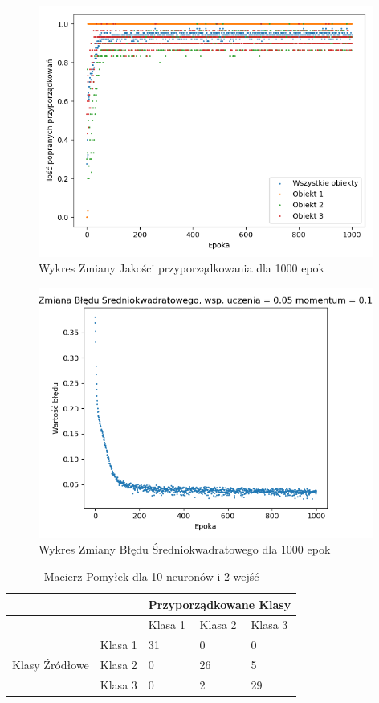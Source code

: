 \documentclass[12pt]{article}
\begin{document}
\begin{figure}[!ht]
 \centering
 \includegraphics[width=11cm]{WykresPrzyporzadkowania10neuron2wejscia4.png}
 \caption{Wykres Zmiany Jakości przyporządkowania dla 1000 epok}
 \vspace{-0.1cm}
 \label{WykresPrzyp14}
\end{figure}

\newpage

\begin{figure}[!ht]
 \centering
 \includegraphics[width=11cm]{WykresBlad10neuron2wejscia4.png}
 \caption{Wykres Zmiany Błędu Średniokwadratowego dla 1000 epok}
 \vspace{-0.1cm}
 \label{WykresBlad14}
\end{figure}


\begin{table}
\caption{\label{tab:tablica13} Macierz Pomyłek dla 10 neuronów i 2 wejść}
\begin{tabular}{ |p{3cm}|p{3cm}|p{2cm}|p{2cm}|p{2cm}|  }
 \hline
 & & 
 \multicolumn{3}{|c|}{Przyporządkowane Klasy} \\
 \hline

   & & Klasa 1 & Klasa 2 & Klasa 3\\
 \hline
\multirow{3}{4em}{Klasy Źródłowe}
   & Klasa 1 & 31 & 0 & 0 \\ 
   & Klasa 2 & 0  & 26 & 5 \\
   & Klasa 3 & 0  & 2   & 29 \\
 \hline
\end{tabular}
\end{table}
\end{document}

